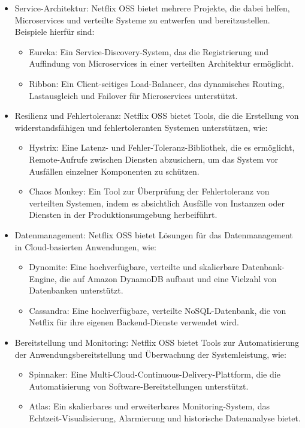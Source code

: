 \begin{itemize}
\item Service-Architektur: Netflix OSS bietet mehrere Projekte, die dabei helfen, Microservices und verteilte Systeme zu entwerfen und bereitzustellen. Beispiele hierfür sind:
\begin{itemize}
\item Eureka: Ein Service-Discovery-System, das die Registrierung und Auffindung von Microservices in einer verteilten Architektur ermöglicht.
\item Ribbon: Ein Client-seitiges Load-Balancer, das dynamisches Routing, Lastausgleich und Failover für Microservices unterstützt.
\end{itemize}
\item Resilienz und Fehlertoleranz: Netflix OSS bietet Tools, die die Erstellung von widerstandsfähigen und fehlertoleranten Systemen unterstützen, wie:
\begin{itemize}
\item Hystrix: Eine Latenz- und Fehler-Toleranz-Bibliothek, die es ermöglicht, Remote-Aufrufe zwischen Diensten abzusichern, um das System vor Ausfällen einzelner Komponenten zu schützen.
\item Chaos Monkey: Ein Tool zur Überprüfung der Fehlertoleranz von verteilten Systemen, indem es absichtlich Ausfälle von Instanzen oder Diensten in der Produktionsumgebung herbeiführt.
\end{itemize}
\item Datenmanagement: Netflix OSS bietet Lösungen für das Datenmanagement in Cloud-basierten Anwendungen, wie:
\begin{itemize}
\item Dynomite: Eine hochverfügbare, verteilte und skalierbare Datenbank-Engine, die auf Amazon DynamoDB aufbaut und eine Vielzahl von Datenbanken unterstützt.
\item Cassandra: Eine hochverfügbare, verteilte NoSQL-Datenbank, die von Netflix für ihre eigenen Backend-Dienste verwendet wird.
\end{itemize}
\item Bereitstellung und Monitoring: Netflix OSS bietet Tools zur Automatisierung der Anwendungsbereitstellung und Überwachung der Systemleistung, wie:
\begin{itemize}
\item Spinnaker: Eine Multi-Cloud-Continuous-Delivery-Plattform, die die Automatisierung von Software-Bereitstellungen unterstützt.
\item Atlas: Ein skalierbares und erweiterbares Monitoring-System, das Echtzeit-Visualisierung, Alarmierung und historische Datenanalyse bietet.

\end{itemize}
\end{itemize}
